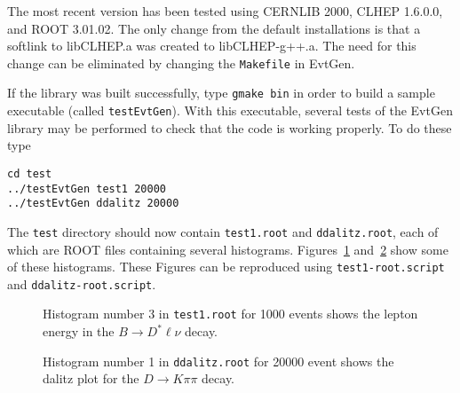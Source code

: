 The most recent version has been tested using CERNLIB 2000,
CLHEP 1.6.0.0, and ROOT 3.01.02.  The only change from the
default installations is that a softlink to libCLHEP.a was
created to libCLHEP-g++.a.  The need for this change can be eliminated by
changing the {\tt Makefile} in EvtGen.

If the library was built successfully, type {\tt gmake bin}
in order to build a sample executable (called {\tt testEvtGen}).  With
this executable, several tests of the EvtGen library may
be performed to check that the code is working properly.  To 
do these type
\begin{verbatim}
cd test
../testEvtGen test1 20000
../testEvtGen ddalitz 20000
\end{verbatim}
The {\tt test} directory should now contain {\tt test1.root} and
{\tt ddalitz.root}, each of which are ROOT files containing
several histograms.  Figures~\ref{fig:test1} and~\ref{fig:ddalitz}
show some of these histograms.  These Figures can be 
reproduced using {\tt test1-root.script} and
{\tt ddalitz-root.script}.

\begin{figure}
\caption{Histogram number 3 in {\tt test1.root} for 1000 events shows
the lepton energy in the $B\rightarrow D^{*}\ell\nu$ decay.}
\label{fig:test1}
\end{figure}

\begin{figure}
\caption{Histogram number 1 in {\tt ddalitz.root} for 20000 event shows
the dalitz plot for the $D\rightarrow K\pi\pi$ decay.}
\label{fig:ddalitz}
\end{figure}








 
